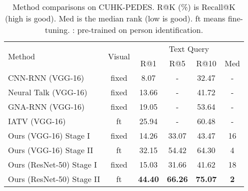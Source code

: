 \documentclass[10pt,final,journal]{IEEEtran}
\begin{document}
\setlength{\tabcolsep}{4pt}
\begin{table}
\footnotesize
\begin{center}
\begin{tabular}{l|c|cccc}
\hline
\multirow{2}{*}{Method} & \multirow{2}{*}{Visual} &\multicolumn{4}{c}{Text Query}\\
 & & R@1 & R@5 & R@10 & Med \\
\shline
CNN-RNN (VGG-16) \cite{reed2016learning} & fixed & 8.07 & - & 32.47 & -\\
Neural Talk (VGG-16) \cite{vinyals2015show} & fixed & 13.66 & - & 41.72 & -\\
GNA-RNN (VGG-16) \cite{li2017person} & fixed & 19.05 & - & 53.64 & -\\
IATV (VGG-16) \cite{li2017identity} & ft & 25.94 & - & 60.48 & - \\
\hline
Ours (VGG-16) Stage I & fixed & 14.26 & 33.07 & 43.47 & 16 \\
Ours (VGG-16) Stage II & ft & 32.15 & 54.42 & 64.30 & 4 \\
Ours (ResNet-50) Stage I & fixed & 15.03 & 31.66 & 41.62 & 18  \\
Ours (ResNet-50) Stage II & ft & \textbf{44.40} & \textbf{66.26} & \textbf{75.07} & \textbf{2} \\
\hline
\end{tabular}
\end{center}
\caption{Method comparisons on CUHK-PEDES. R@K (\%) is Recall@K (high is good). Med  is the median rank (low is good). ft means fine-tuning. : pre-trained on person identification.}
\label{table:CUHK}
\end{table}
\end{document}

